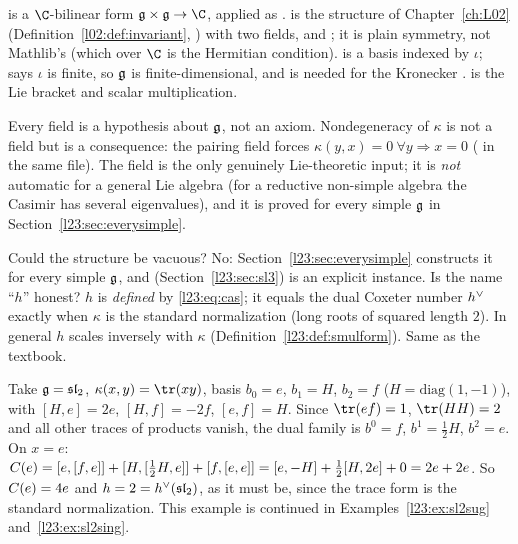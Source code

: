 \begin{dictionary}
 is a $\C$-bilinear form $\lxxiiig\times\lxxiiig\to\C$, applied as .
 is the structure of Chapter~\ref{ch:L02} (Definition~\ref{l02:def:invariant},
) with two fields,  and
; it is plain symmetry, not Mathlib's  (which over
$\C$ is the Hermitian condition).  is a basis indexed by $\iota$; \lean{[Fintype ι]} says
$\iota$ is finite, so $\mathfrak g$ is finite-dimensional, and \lean{[DecidableEq ι]} is needed for the Kronecker
.  is the Lie bracket and  scalar multiplication.

Every field is a hypothesis about $\mathfrak g$, not an axiom. Nondegeneracy of $\kappa$ is not a field but is a
consequence: the pairing field forces $\kappa(y,x)=0\ \forall y\Rightarrow x=0$
( in the same file). The field  is the only genuinely
Lie-theoretic input; it is \emph{not} automatic for a general Lie algebra (for a reductive non-simple algebra
the Casimir has several eigenvalues), and it is proved for every simple $\mathfrak g$ in
Section~\ref{l23:sec:everysimple}.

Could the structure be vacuous? No: Section~\ref{l23:sec:everysimple} constructs it for every simple $\mathfrak g$, and
 (Section~\ref{l23:sec:sl3}) is an explicit instance. Is the name ``$h$'' honest? $h$ is
\emph{defined} by \eqref{l23:eq:cas}; it equals the dual Coxeter number $h^\vee$ exactly when $\kappa$ is the
standard normalization (long roots of squared length $2$). In general $h$ scales inversely with $\kappa$
(Definition~\ref{l23:def:smulform}). Same as the textbook.
\end{dictionary}

\begin{example}\label{l23:ex:sl2}
Take $\mathfrak g=\mathfrak{sl}_2$, $\kappa(x,y)=\tr(xy)$, basis $b_0=e$, $b_1=H$, $b_2=f$ ($H=\mathrm{diag}(1,-1)$), with
$[H,e]=2e$, $[H,f]=-2f$, $[e,f]=H$. Since $\tr(ef)=1$, $\tr(HH)=2$ and all other traces of products vanish, the dual family is
$b^0=f$, $b^1=\tfrac12H$, $b^2=e$. On $x=e$:
$C(e)=[e,[f,e]]+[H,[\tfrac12H,e]]+[f,[e,e]]=[e,-H]+\tfrac12[H,2e]+0=2e+2e$. So $C(e)=4e$ and
$h=2=h^\vee(\mathfrak{sl}_2)$, as it must be, since the trace form is the standard normalization. This example is
continued in Examples~\ref{l23:ex:sl2sug} and~\ref{l23:ex:sl2sing}.
\end{example}

